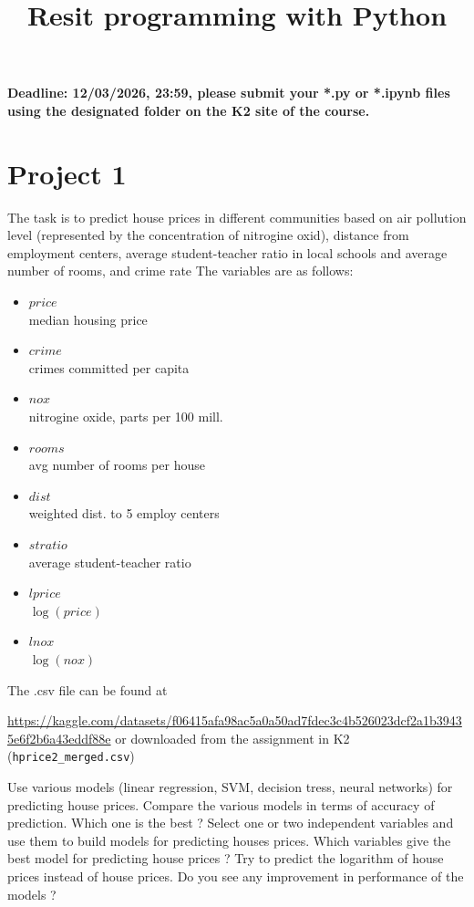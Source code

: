 \documentclass{article}
\title{Resit programming with Python }
\author{}
\date{}
\begin{document}
\maketitle

\textbf{Deadline: 12/03/2026, 23:59,  please submit your *.py or *.ipynb files using the designated folder on the K2 site of the course.}


\section*{Project 1 }
 The task is to predict house prices in different communities based on air pollution level (represented by the concentration of nitrogine oxid), 
distance from employment centers, average student-teacher ratio 
 in local schools and average number of rooms, and crime rate The variables are as follows:
    \begin{itemize}
    \item{$price$ \\}       
	median housing price
    \item{$crime$ \\}                    
		crimes committed per capita
    \item{$nox$ \\}                      
	nitrogine oxide, parts per 100 mill.
    \item{$rooms$ \\}                    
    avg number of rooms per house
    \item{$dist$ \\}                     
      weighted dist. to 5 employ centers
    \item{$stratio$ \\}                  average student-teacher ratio
    \item{$lprice$ \\}                   $\log(price)$
    \item{$lnox$ \\}                     $\log(nox)$
   \end{itemize}

   The .csv file can be found at  

   \url{https://kaggle.com/datasets/f06415afa98ac5a0a50ad7fdec3c4b526023dcf2a1b39435e6f2b6a43eddf88e} or downloaded
   from the assignment in K2 (\texttt{hprice2\_merged.csv})
    
     Use various models (linear regression, SVM, decision tress, neural networks) for predicting house prices. Compare the various models in terms of accuracy of prediction. Which one is the best ? 
 Select one or two independent variables  and use them to build models for predicting houses prices. Which variables give the best 
 model for predicting  house prices  ?  Try to predict the logarithm of house prices instead of house prices. Do you see any improvement in performance of the models ?
\end{document}
